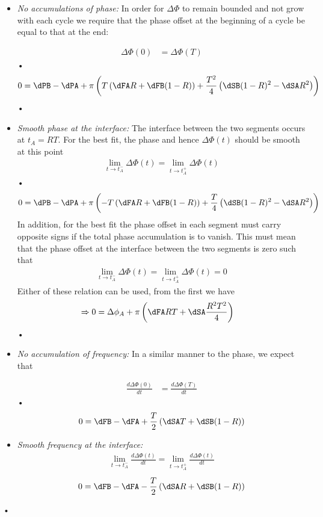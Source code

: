 \documentclass[/home/greg/Thesis/main/main.tex]{subfiles}
\begin{document}
\begin{itemize}

\item \emph{No accumulations of phase:} In order for $\Delta\Phi$ to remain
    bounded and not grow with each cycle we require that the phase offset at
    the beginning of a cycle be equal to that at the end:

\begin{align}
\Delta\Phi(0) & = \Delta\Phi(T) 
\end{align}•
\begin{equation}
0  = \dPB - \dPA+ \pi\left(T\left(\dFA R + \dFB (1-R)\right) + \frac{T^{2}}{4}\left(\dSB (1-R)^{2} - \dSA R^{2}\right)\right)
\end{equation}•

\item\emph{Smooth phase at the interface:} The interface between the two
    segments occurs at $t_{A} = RT$. For the best fit, the phase and hence
    $\Delta\Phi(t)$ should be smooth at this point
\begin{align}
\lim_{t\rightarrow t_{A}^{-}}\Delta\Phi(t) = \lim_{t\rightarrow t_{A}^{+}}\Delta\Phi(t)
\end{align}•
\begin{equation}
0 = \dPB - \dPA + \pi\left(-T\left(\dFA R + \dFB (1-R)\right) + \frac{T}{4}\left(\dSB (1-R)^{2} - \dSA R^{2}\right)\right)
\end{equation}
In addition, for the best fit the phase offset in each segment must carry opposite signs if the total phase accumulation 
is to vanish. This must mean that the phase offset at the interface between the two segments is zero such that
\begin{align}
\lim_{t\rightarrow t_{A}^{-}}\Delta\Phi(t) = \lim_{t\rightarrow t_{A}^{+}}\Delta\Phi(t)=0
\end{align}
Either of these relation can be used, from the first we have
\begin{align}
\Rightarrow 0 & = \Delta\phi_{A} + \pi\left(\dFA RT + \dSA \frac{R^{2}T^{2}}{4}\right)
\end{align}•


\item\emph{No accumulation of frequency:} In a similar manner to the phase, we expect that

\begin{align}
\frac{d\Delta\Phi(0)}{dt} & = \frac{d\Delta\Phi(T)}{dt} 
\end{align}•
\begin{equation}
0 = \dFB - \dFA + \frac{T}{2}\left(\dSA T+ \dSB (1-R)\right)
\end{equation}

\item\emph{Smooth frequency at the interface:} 
\begin{align}
\lim_{t\rightarrow t_{A}^{-}}\frac{d\Delta\Phi(t)}{dt} = \lim_{t\rightarrow t_{A}^{+}}\frac{d\Delta\Phi(t)}{dt}
\end{align}
\begin{equation}
0 = \dFB - \dFA - \frac{T}{2}\left(\dSA R + \dSB (1-R)\right)
\end{equation}
\end{itemize}•
\end{document}
